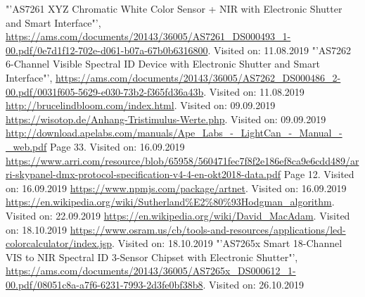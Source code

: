 \documentclass[11pt]{scrartcl}
\begin{document}
\begin{thebibliography}{xxxxxxxxxxxxxxxxxxx}
    "'AS7261 XYZ Chromatic White Color Sensor + NIR with Electronic Shutter and Smart Interface"', \url{https://ams.com/documents/20143/36005/AS7261_DS000493_1-00.pdf/0e7d1f12-702e-d061-b07a-67b0b6316800}. Visited on: 11.08.2019
    "'AS7262 6-Channel Visible Spectral ID Device with Electronic Shutter and Smart Interface"', \url{https://ams.com/documents/20143/36005/AS7262_DS000486_2-00.pdf/0031f605-5629-e030-73b2-f365fd36a43b}. Visited on: 11.08.2019
     \url{http://brucelindbloom.com/index.html}. Visited on: 09.09.2019
     \url{https://wisotop.de/Anhang-Tristimulus-Werte.php}. Visited on: 09.09.2019
     \url{http://download.apelabs.com/manuals/Ape_Labs_-_LightCan_-_Manual_-_web.pdf} Page 33. Visited on: 16.09.2019
     \url{https://www.arri.com/resource/blob/65958/560471fec7f8f2e186ef8ca9e6cdd489/arri-skypanel-dmx-protocol-specification-v4-4-en-okt2018-data.pdf} Page 12. Visited on: 16.09.2019
     \url{https://www.npmjs.com/package/artnet}. Visited on: 16.09.2019
     \url{https://en.wikipedia.org/wiki/Sutherland%E2%80%93Hodgman_algorithm}. Visited on: 22.09.2019
     \url{https://en.wikipedia.org/wiki/David_MacAdam}. Visited on: 18.10.2019
     \url{https://www.osram.us/cb/tools-and-resources/applications/led-colorcalculator/index.jsp}. Visited on: 18.10.2019
    "'AS7265x Smart 18-Channel VIS to NIR Spectral ID 3-Sensor Chipset with Electronic Shutter"', \url{https://ams.com/documents/20143/36005/AS7265x_DS000612_1-00.pdf/08051c8a-a7f6-6231-7993-2d3fe0bf38b8}. Visited on: 26.10.2019
\end{thebibliography}
\endgroup
\clearpage

\end{document}
